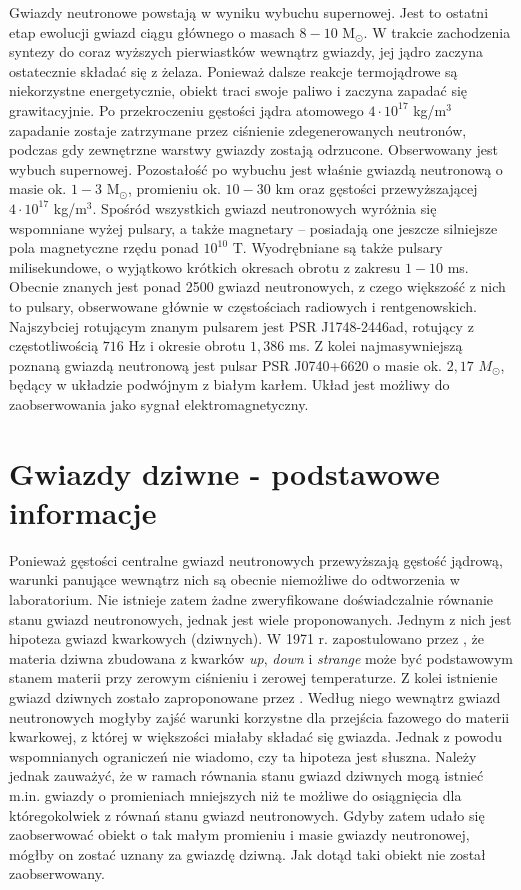 \documentclass{bachelor_thesis}
\begin{document}
        \indent Gwiazdy neutronowe powstają w wyniku wybuchu supernowej. Jest to ostatni etap ewolucji gwiazd ciągu głównego o masach $8-10\textrm{ M}_\odot$. W trakcie zachodzenia syntezy do coraz wyższych pierwiastków wewnątrz gwiazdy, jej jądro zaczyna ostatecznie składać się z żelaza. Ponieważ dalsze reakcje termojądrowe są niekorzystne energetycznie, obiekt traci swoje paliwo i zaczyna zapadać się grawitacyjnie. Po przekroczeniu gęstości jądra atomowego $4\cdot 10^{17}$ kg/m$^3$ zapadanie zostaje zatrzymane przez ciśnienie zdegenerowanych neutronów, podczas gdy zewnętrzne warstwy gwiazdy zostają odrzucone. Obserwowany jest wybuch supernowej. Pozostałość po wybuchu jest właśnie gwiazdą neutronową o masie ok. $1-3\textrm{ M}_\odot$, promieniu ok. $10-30\textrm{ km}$ oraz gęstości przewyższającej $4\cdot 10^{17}$ kg/m$^3$. Spośród wszystkich gwiazd neutronowych wyróżnia się wspomniane wyżej pulsary, a także magnetary -- posiadają one jeszcze silniejsze pola magnetyczne rzędu ponad $10^{10}$ T. Wyodrębniane są także pulsary milisekundowe, o wyjątkowo krótkich okresach obrotu z zakresu $1-10$ ms.\\
        \indent  Obecnie znanych jest ponad 2500 gwiazd neutronowych, z czego większość z nich to pulsary, obserwowane głównie w częstościach radiowych i rentgenowskich. Najszybciej rotującym znanym pulsarem jest PSR J1748-2446ad, rotujący z częstotliwością $716$ Hz i okresie obrotu $1,386$ ms. Z kolei najmasywniejszą poznaną gwiazdą neutronową jest pulsar PSR J0740+6620 o masie ok. $2,17$ $M_\odot$, będący w układzie podwójnym z białym karłem. Układ jest możliwy do zaobserwowania jako sygnał elektromagnetyczny.
        \section{Gwiazdy dziwne - podstawowe informacje}
        Ponieważ gęstości centralne gwiazd neutronowych przewyższają gęstość jądrową, warunki panujące wewnątrz nich są obecnie niemożliwe do odtworzenia w laboratorium. Nie istnieje zatem żadne zweryfikowane doświadczalnie równanie stanu gwiazd neutronowych, jednak jest wiele proponowanych. Jednym z nich jest hipoteza gwiazd kwarkowych (dziwnych). W 1971 r. zapostulowano przez \cite{Bodmer1971}, że materia dziwna zbudowana z kwarków \textit{up}, \textit{down} i \textit{strange} może być podstawowym stanem materii przy zerowym ciśnieniu i zerowej temperaturze. Z kolei istnienie gwiazd dziwnych zostało zaproponowane przez \cite{Witten1984}. Według niego wewnątrz gwiazd neutronowych mogłyby zajść warunki korzystne dla przejścia fazowego do materii kwarkowej, z której w większości miałaby składać się gwiazda. Jednak z powodu wspomnianych ograniczeń nie wiadomo, czy ta hipoteza jest słuszna. Należy jednak zauważyć, że w ramach równania stanu gwiazd dziwnych mogą istnieć m.in. gwiazdy o promieniach mniejszych niż te możliwe do osiągnięcia dla któregokolwiek z równań stanu gwiazd neutronowych. Gdyby zatem udało się zaobserwować obiekt o tak małym promieniu i masie gwiazdy neutronowej, mógłby on zostać uznany za gwiazdę dziwną. Jak dotąd taki obiekt nie został zaobserwowany.
\end{document}
